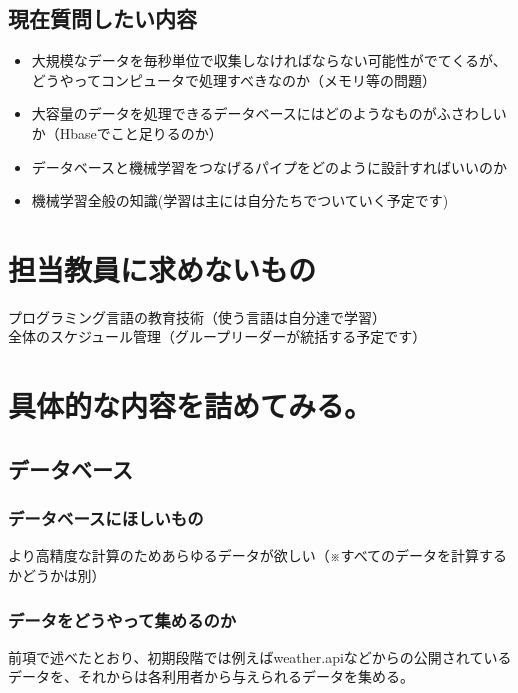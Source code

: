 \documentclass{scrartcl}
\begin{document}
\subsection{現在質問したい内容}
\label{sec:org49208d1}
\begin{itemize}
\item 大規模なデータを毎秒単位で収集しなければならない可能性がでてくるが、どうやってコンピュータで処理すべきなのか（メモリ等の問題）\\
\item 大容量のデータを処理できるデータベースにはどのようなものがふさわしいか（Hbaseでこと足りるのか）\\
\item データベースと機械学習をつなげるパイプをどのように設計すればいいのか\\
\item 機械学習全般の知識(学習は主には自分たちでついていく予定です)\\
\end{itemize}
\section{担当教員に求めないもの}
\label{sec:org28177e3}
プログラミング言語の教育技術（使う言語は自分達で学習）\\
全体のスケジュール管理（グループリーダーが統括する予定です）\\
\section{具体的な内容を詰めてみる。}
\label{sec:org9502074}
\subsection{データベース}
\label{sec:orge530610}
\subsubsection{データベースにほしいもの}
\label{sec:orgf96a4d7}
より高精度な計算のためあらゆるデータが欲しい（※すべてのデータを計算するかどうかは別）\\
\subsubsection{データをどうやって集めるのか}
\label{sec:orgc9a16d1}
前項で述べたとおり、初期段階では例えばweather.apiなどからの公開されているデータを、それからは各利用者から与えられるデータを集める。\\
\end{document}
